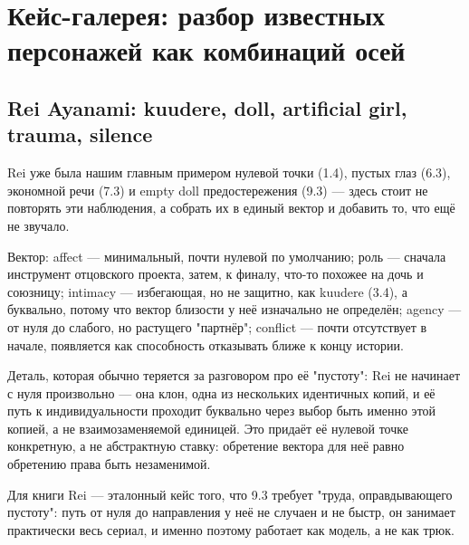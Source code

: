 \setcounter{chapter}{10}
\chapter{Кейс-галерея: разбор известных персонажей как комбинаций осей}

\section{Rei Ayanami: kuudere, doll, artificial girl, trauma, silence}

Rei уже была нашим главным примером нулевой точки (1.4), пустых глаз (6.3), экономной речи (7.3) и empty doll предостережения (9.3) — здесь стоит не повторять эти наблюдения, а собрать их в единый вектор и добавить то, что ещё не звучало.

Вектор: affect — минимальный, почти нулевой по умолчанию; роль — сначала инструмент отцовского проекта, затем, к финалу, что-то похожее на дочь и союзницу; intimacy — избегающая, но не защитно, как kuudere (3.4), а буквально, потому что вектор близости у неё изначально не определён; agency — от нуля до слабого, но растущего "партнёр"; conflict — почти отсутствует в начале, появляется как способность отказывать ближе к концу истории.

Деталь, которая обычно теряется за разговором про её "пустоту": Rei не начинает с нуля произвольно — она клон, одна из нескольких идентичных копий, и её путь к индивидуальности проходит буквально через выбор быть именно этой копией, а не взаимозаменяемой единицей. Это придаёт её нулевой точке конкретную, а не абстрактную ставку: обретение вектора для неё равно обретению права быть незаменимой.

Для книги Rei — эталонный кейс того, что 9.3 требует "труда, оправдывающего пустоту": путь от нуля до направления у неё не случаен и не быстр, он занимает практически весь сериал, и именно поэтому работает как модель, а не как трюк.
